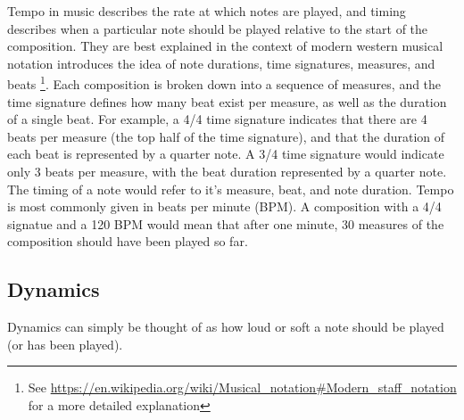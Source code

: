 \begin{appendices}
Tempo in music describes the rate at which notes are played, and timing describes when a particular note should be played relative to the start of the composition. They are best explained in the context of modern western musical notation introduces the idea of note durations, time signatures, measures, and beats \footnote{See \url{https://en.wikipedia.org/wiki/Musical_notation\#Modern_staff_notation} for a more detailed explanation}.  Each composition is broken down into a sequence of measures, and the time signature defines how many beat exist per measure, as well as the duration of a single beat. For example, a 4/4 time signature indicates that there are 4 beats per measure (the top half of the time signature), and that the duration of each beat is represented by a quarter note. A 3/4 time signature would indicate only 3 beats per measure, with the beat duration represented by a quarter note. The timing of a note would refer to it's measure, beat, and note duration. Tempo is most commonly given in beats per minute (BPM). A composition with a 4/4 signatue and a 120 BPM would mean that after one minute, 30 measures of the composition should have been played so far. 

\subsection{Dynamics}

Dynamics can simply be thought of as how loud or soft a note should be played (or has been played). 


\end{appendices}
